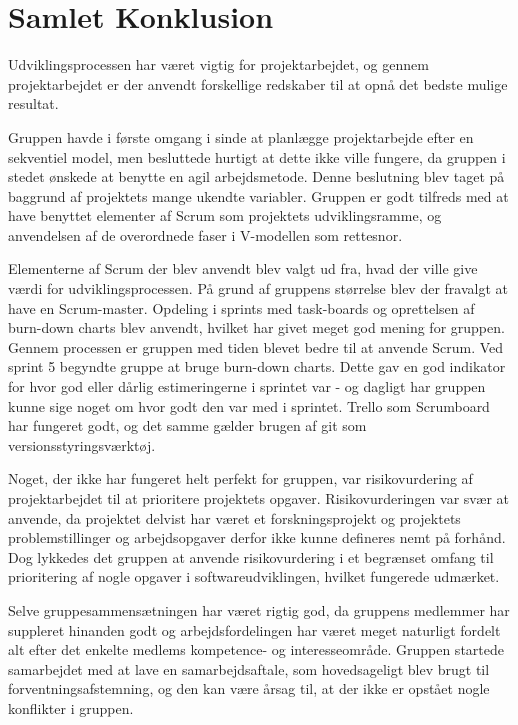 \chapter{Samlet Konklusion}\label{SamletKonklusion}
Udviklingsprocessen har været vigtig for projektarbejdet, og gennem projektarbejdet er der anvendt forskellige redskaber til at opnå det bedste mulige resultat. 

Gruppen havde i første omgang i sinde at planlægge projektarbejde efter en sekventiel model, men besluttede hurtigt at dette ikke ville fungere, da gruppen i stedet ønskede at benytte en agil arbejdsmetode. Denne beslutning blev taget på baggrund af projektets mange ukendte variabler. Gruppen er godt tilfreds med at have benyttet elementer af Scrum som projektets udviklingsramme, og anvendelsen af de overordnede faser i V-modellen som rettesnor.

Elementerne af Scrum der blev anvendt blev valgt ud fra, hvad der ville give værdi for udviklingsprocessen. På grund af gruppens størrelse blev der fravalgt at have en Scrum-master. Opdeling i sprints med task-boards og oprettelsen af burn-down charts blev anvendt, hvilket har givet meget god mening for gruppen. Gennem processen er gruppen med tiden blevet bedre til at anvende Scrum. Ved sprint 5 begyndte gruppe at bruge burn-down charts. Dette gav en god indikator for hvor god eller dårlig estimeringerne i sprintet var - og dagligt har gruppen kunne sige noget om hvor godt den var med i sprintet. Trello som Scrumboard har fungeret godt, og det samme gælder brugen af git som versionsstyringsværktøj.

Noget, der ikke har fungeret helt perfekt for gruppen, var risikovurdering af projektarbejdet til at prioritere projektets opgaver. Risikovurderingen var svær at anvende, da projektet delvist har været et forskningsprojekt og projektets problemstillinger og arbejdsopgaver derfor ikke kunne defineres nemt på forhånd. Dog lykkedes det gruppen at anvende risikovurdering i et begrænset omfang til prioritering af nogle opgaver i softwareudviklingen, hvilket fungerede udmærket. 

Selve gruppesammensætningen har været rigtig god, da gruppens medlemmer har suppleret hinanden godt og arbejdsfordelingen har været meget naturligt fordelt alt efter det enkelte medlems kompetence- og interesseområde. Gruppen startede samarbejdet med at lave en samarbejdsaftale, som hovedsageligt blev brugt til forventningsafstemning, og den kan være årsag til, at der ikke er opstået nogle konflikter i gruppen. 
